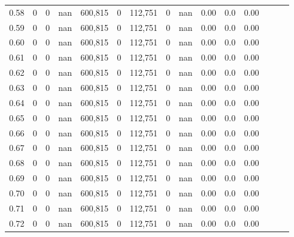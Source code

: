 \begin{tabular}{rrrrrrrrrrrrrrr}
0.58 &        0 &        0 &   nan &  600,815 &        0 &  112,751 &        0 &   nan &  0.00 &                   0.0 &      0.00 \\
0.59 &        0 &        0 &   nan &  600,815 &        0 &  112,751 &        0 &   nan &  0.00 &                   0.0 &      0.00 \\
0.60 &        0 &        0 &   nan &  600,815 &        0 &  112,751 &        0 &   nan &  0.00 &                   0.0 &      0.00 \\
0.61 &        0 &        0 &   nan &  600,815 &        0 &  112,751 &        0 &   nan &  0.00 &                   0.0 &      0.00 \\
0.62 &        0 &        0 &   nan &  600,815 &        0 &  112,751 &        0 &   nan &  0.00 &                   0.0 &      0.00 \\
0.63 &        0 &        0 &   nan &  600,815 &        0 &  112,751 &        0 &   nan &  0.00 &                   0.0 &      0.00 \\
0.64 &        0 &        0 &   nan &  600,815 &        0 &  112,751 &        0 &   nan &  0.00 &                   0.0 &      0.00 \\
0.65 &        0 &        0 &   nan &  600,815 &        0 &  112,751 &        0 &   nan &  0.00 &                   0.0 &      0.00 \\
0.66 &        0 &        0 &   nan &  600,815 &        0 &  112,751 &        0 &   nan &  0.00 &                   0.0 &      0.00 \\
0.67 &        0 &        0 &   nan &  600,815 &        0 &  112,751 &        0 &   nan &  0.00 &                   0.0 &      0.00 \\
0.68 &        0 &        0 &   nan &  600,815 &        0 &  112,751 &        0 &   nan &  0.00 &                   0.0 &      0.00 \\
0.69 &        0 &        0 &   nan &  600,815 &        0 &  112,751 &        0 &   nan &  0.00 &                   0.0 &      0.00 \\
0.70 &        0 &        0 &   nan &  600,815 &        0 &  112,751 &        0 &   nan &  0.00 &                   0.0 &      0.00 \\
0.71 &        0 &        0 &   nan &  600,815 &        0 &  112,751 &        0 &   nan &  0.00 &                   0.0 &      0.00 \\
0.72 &        0 &        0 &   nan &  600,815 &        0 &  112,751 &        0 &   nan &  0.00 &                   0.0 &      0.00 \\

\end{tabular}
